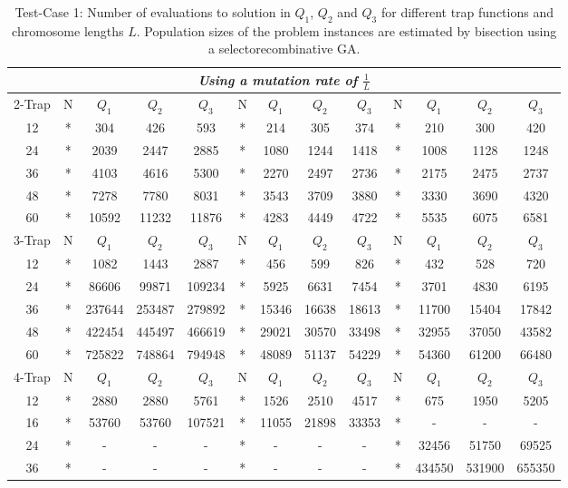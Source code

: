 \begin{sidewaystable}[htbp]
{\begin{tabular}{c|c c c c|c c c c|c c c c|}
\hline
\multicolumn{13}{c}{{\it Using a mutation rate of $\frac{1}{L}$}}\\
\hline
2-Trap&N&$Q_1$&$Q_2$&$Q_3$&N&$Q_1$&$Q_2$&$Q_3$&N&$Q_1$&$Q_2$&{\it {\bf $Q_3$}}\\
\hline
12&*&304 &426 &593 &* &214 &305 &374 &*&210 &300 &420 \\
24&*&2039 &2447 &2885 &* &1080 &1244 &1418 &*&1008 &1128 &1248 \\
36&*&4103 &4616 &5300 &* &2270 &2497 &2736 &*&2175 &2475 &2737 \\
48&*&7278 &7780 &8031 &* &3543 &3709 &3880 &*&3330 &3690 &4320 \\
60&*&10592 &11232 &11876 &*&4283& 4449& 4722&*& 5535& 6075&6581\\
\hline
3-Trap&N&$Q_1$&$Q_2$&$Q_3$&N&$Q_1$&$Q_2$&$Q_3$&N&$Q_1$&$Q_2$&{\bf $Q_3$}\\
\hline
12&*&1082 &1443 &2887 &* &456 &599 &826 &*&432 &528 &720 \\
24&*&86606 &99871 &109234 &* &5925 &6631 &7454 &*&3701 &4830 &6195 \\
36&*&237644 &253487 &279892 &* &15346 &16638 &18613 &*&11700 &15404 &17842 \\
48&*&422454 &445497 & 466619&* &29021 &30570 &33498 &*&32955 &37050 &43582 \\
60&*&725822 &748864 &794948 &* &48089 &51137 &54229 &*&54360 &61200 &66480 \\
\hline
4-Trap&N&$Q_1$&$Q_2$&$Q_3$&N&$Q_1$&$Q_2$&$Q_3$&N&$Q_1$&$Q_2$&{\bf $Q_3$}\\
\hline
12&*&2880 &2880 &5761 &* &1526 &2510 &4517 &*&675 &1950 &5205\\
16&*&53760 &53760 &107521 &* &11055 &21898 &33353 &*&-&-&-\\
24&*&-&-&-&*&-&-&-&*&32456 &51750 &69525 \\
36&*&-&-&-&*&-&-&-&*&434550 &531900 &655350 \\
\hline

\end{tabular}
}
\caption{Test-Case 1: Number of evaluations to solution in $Q_1$, $Q_2$ and $Q_3$ for different trap functions and chromosome lengths $L$. Population sizes of the problem instances are estimated by bisection using a selectorecombinative GA.\label{table:numericalresultstestcase1}}
\end{sidewaystable}


